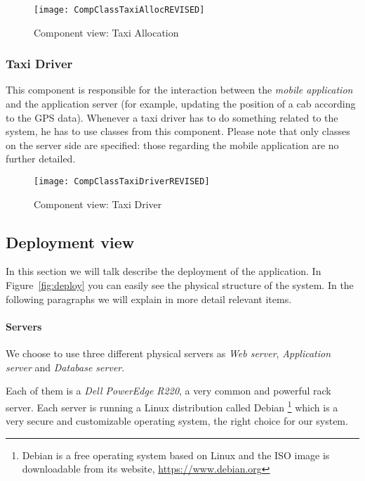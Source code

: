 \begin{figure}
    \centering
    \texttt{[image: CompClassTaxiAllocREVISED]}
    \caption{Component view: Taxi Allocation}
    \label{fig:compclasstaxialloc}
\end{figure}

\pagebreak
\subsubsection{Taxi Driver} %
This component is responsible for the interaction between the \emph{mobile application} and the application server (for example, updating the position of a cab according to the GPS data). Whenever a taxi driver has to do something related to the system, he has to use classes from this component. Please note that only classes on the server side are specified: those regarding the mobile application are no further detailed.

\begin{figure}
    \centering
    \texttt{[image: CompClassTaxiDriverREVISED]}
    \caption{Component view: Taxi Driver}
    \label{fig:compclasstaxidriver}
\end{figure}

\pagebreak
\subsection{Deployment view}
\label{sec:deploy}
In this section we will talk describe the deployment of the application. In Figure~\ref{fig:deploy} 
you can easily see the physical structure of the system. In the following
paragraphs we will explain in more detail relevant items.

\paragraph{Servers} We choose to use three different physical servers as 
\emph{Web server}, \emph{Application server} and \emph{Database server}. 

Each of them is a \emph{Dell PowerEdge R220}\cite{r220}, a very common and 
powerful rack server.
Each server is running a Linux distribution called Debian
\footnote{Debian is a free operating system based on Linux and the ISO image is downloadable from its website, 
\url{https://www.debian.org}}
which is a very secure and customizable operating system, the right choice for our system. 

